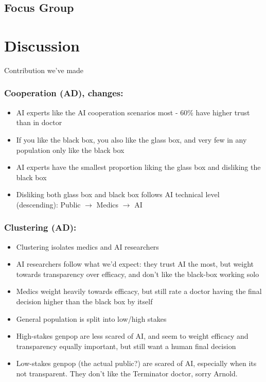\documentclass[manuscript,screen,review]{acmart}
\begin{document}
\subsection{Focus Group}


\section{Discussion}
Contribution we've made


\subsubsection{Cooperation (AD), changes:}
\begin{itemize}
    \item AI experts like the AI cooperation scenarios most - 60\% have higher trust than in doctor
    \item If you like the black box, you also like the glass box, and very few in any population only like the black box
    \item AI experts have the smallest proportion liking the glass box and disliking the black box
    \item Disliking both glass box and black box follows AI technical level (descending): Public $\rightarrow$ Medics $\rightarrow$ AI
\end{itemize}

\subsubsection{Clustering (AD):}
\begin{itemize}
    \item Clustering isolates medics and AI researchers
    \item AI researchers follow what we'd expect: they trust AI the most, but weight towards transparency over efficacy, and don't like the black-box working solo
    \item Medics weight heavily towards efficacy, but still rate a doctor having the final decision higher than the black box by itself
    \item General population is split into low/high stakes
    \item High-stakes genpop are less scared of AI, and seem to weight efficacy and transparency equally important, but still want a human final decision
    \item Low-stakes genpop (the actual public?) are scared of AI, especially when its not transparent. They don't like the Terminator doctor, sorry Arnold.
\end{itemize}
\end{document}
